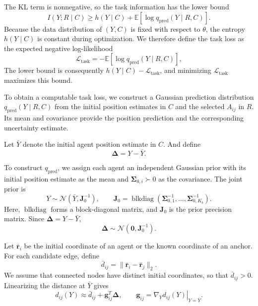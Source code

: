 The KL term is nonnegative, so the task information has the lower bound
\begin{equation}
    I(Y;R\mid C)
    \ge
    h(Y\mid C)
    +\mathbb E\!\left[\log q_{\mathrm{pred}}(Y\mid R,C)\right].
    \label{eq:task_information_bound}
\end{equation}
Because the data distribution of $(Y,C)$ is fixed with respect to $\theta$, the entropy $h(Y\mid C)$ is constant during optimization. We therefore define the task loss as the expected negative log-likelihood
\begin{equation}
    \mathcal L_{\mathrm{task}}
    =
    -\mathbb E\!\left[\log q_{\mathrm{pred}}(Y\mid R,C)\right],
    \label{eq:task_nll}
\end{equation}
The lower bound is consequently $h(Y\mid C)-\mathcal L_{\mathrm{task}}$, and minimizing $\mathcal L_{\mathrm{task}}$ maximizes this bound.

To obtain a computable task loss, we construct a Gaussian prediction distribution $q_{\mathrm{pred}}(Y\mid R,C)$ from the initial position estimates in $C$ and the selected $A_{ij}$ in $R$. Its mean and covariance provide the position prediction and the corresponding uncertainty estimate.

Let $\bar Y$ denote the initial agent position estimate in $C$. And define
\[
    \boldsymbol{\Delta}=Y-\bar Y.
\]

To construct $q_{\mathrm{pred}}$, we assign each agent an independent Gaussian prior with its initial position estimate as the mean and $\mathbf{\Sigma}_{0,i}\succ0$ as the covariance. The joint prior is
\[
    Y\sim\mathcal N(\bar Y,\mathbf J_0^{-1}),
    \qquad
    \mathbf J_0
    =
    \operatorname{blkdiag}
    \left(
    \mathbf{\Sigma}_{0,1}^{-1},
    \ldots,
    \mathbf{\Sigma}_{0,K_b}^{-1}
    \right).
\]
Here, $\operatorname{blkdiag}$ forms a block-diagonal matrix, and $\mathbf J_0$ is the prior precision matrix. Since $\boldsymbol{\Delta}=Y-\bar Y$,
\[
    \boldsymbol{\Delta}
    \sim\mathcal N(\mathbf 0,\mathbf J_0^{-1}).
\]

Let $\bar{\mathbf r}_i$ be the initial coordinate of an agent or the known coordinate of an anchor. For each candidate edge, define
\[
    \bar d_{ij}
    =
    \|\bar{\mathbf r}_i-\bar{\mathbf r}_j\|_2.
\]
We assume that connected nodes have distinct initial coordinates, so that $\bar d_{ij}>0$. Linearizing the distance at $\bar Y$ gives
\[
    d_{ij}(Y)
    \approx
    \bar d_{ij}
    +\mathbf g_{ij}^{T}\boldsymbol{\Delta},
    \qquad
    \mathbf g_{ij}
    =
    \left.\nabla_Y d_{ij}(Y)\right|_{Y=\bar Y}.
\]

